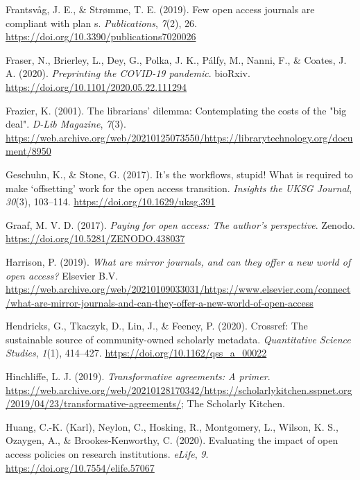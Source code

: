 \documentclass[a4paper,man,floatsintext,longtable,noextraspace,12pt]{apa6}
\newenvironment{CSLReferences}%
  {}%
  {\par}
\begin{document}
\begin{CSLReferences}{1}{0}
\leavevmode\hypertarget{ref-Frantsv_g_2019}{}%
Frantsvåg, J. E., \& Strømme, T. E. (2019). Few open access journals are
compliant with plan s. \emph{Publications}, \emph{7}(2), 26.
\url{https://doi.org/10.3390/publications7020026}

\leavevmode\hypertarget{ref-Fraser_2020}{}%
Fraser, N., Brierley, L., Dey, G., Polka, J. K., Pálfy, M., Nanni, F.,
\& Coates, J. A. (2020). \emph{Preprinting the {COVID}-19 pandemic}.
{bioRxiv}. \url{https://doi.org/10.1101/2020.05.22.111294}

\leavevmode\hypertarget{ref-Frazier_2001}{}%
Frazier, K. (2001). The librarians' dilemma: Contemplating the costs of
the "big deal". \emph{D-Lib Magazine}, \emph{7}(3).
\url{https://web.archive.org/web/20210125073550/https://librarytechnology.org/document/8950}

\leavevmode\hypertarget{ref-Geschuhn_2017}{}%
Geschuhn, K., \& Stone, G. (2017). It's the workflows, stupid! What is
required to make {`offsetting'} work for the open access transition.
\emph{Insights the {UKSG} Journal}, \emph{30}(3), 103--114.
\url{https://doi.org/10.1629/uksg.391}

\leavevmode\hypertarget{ref-Graaf_2017}{}%
Graaf, M. V. D. (2017). \emph{Paying for open access: The author's
perspective}. Zenodo. \url{https://doi.org/10.5281/ZENODO.438037}

\leavevmode\hypertarget{ref-Harrison_2019}{}%
Harrison, P. (2019). \emph{What are mirror journals, and can they offer
a new world of open access?} Elsevier B.V.
\url{https://web.archive.org/web/20210109033031/https://www.elsevier.com/connect/what-are-mirror-journals-and-can-they-offer-a-new-world-of-open-access}

\leavevmode\hypertarget{ref-Hendricks_2020}{}%
Hendricks, G., Tkaczyk, D., Lin, J., \& Feeney, P. (2020). Crossref: The
sustainable source of community-owned scholarly metadata.
\emph{Quantitative Science Studies}, \emph{1}(1), 414--427.
\url{https://doi.org/10.1162/qss_a_00022}

\leavevmode\hypertarget{ref-Hinchliffe_2019}{}%
Hinchliffe, L. J. (2019). \emph{Transformative agreements: A primer}.
\url{https://web.archive.org/web/20210128170342/https://scholarlykitchen.sspnet.org/2019/04/23/transformative-agreements/};
The Scholarly Kitchen.

\leavevmode\hypertarget{ref-Huang_2020}{}%
Huang, C.-K. (Karl), Neylon, C., Hosking, R., Montgomery, L., Wilson, K.
S., Ozaygen, A., \& Brookes-Kenworthy, C. (2020). Evaluating the impact
of open access policies on research institutions. \emph{{eLife}},
\emph{9}. \url{https://doi.org/10.7554/elife.57067}


\end{CSLReferences}
\end{document}
